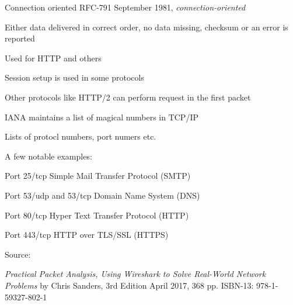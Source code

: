 \documentclass[Screen16to9,17pt]{foils}
\begin{document}

\begin{list1}
\item Connection oriented RFC-791 September 1981, \emph{connection-oriented}
\item Either data delivered in correct order, no data missing, checksum or an error is reported
\item Used for HTTP and others
\end{list1}



\begin{list2}
\item Session setup is used in some protocols
\item Other protocols like HTTP/2 can perform request in the first packet
\end{list2}




\begin{list1}
\item IANA maintains a list of magical numbers in TCP/IP
\item Lists of protocl numbers, port numers etc.
\item A few notable examples:
\begin{list2}
\item Port 25/tcp Simple Mail Transfer Protocol (SMTP)
\item Port 53/udp and 53/tcp Domain Name System (DNS)
\item Port 80/tcp Hyper Text Transfer Protocol (HTTP)
\item Port 443/tcp HTTP over TLS/SSL (HTTPS)
\end{list2}
\item Source: 
\end{list1}




\emph{Practical Packet Analysis,
Using Wireshark to Solve Real-World Network Problems}
by Chris Sanders, 3rd Edition
April 2017, 368 pp.
ISBN-13:
978-1-59327-802-1

\end{document}
